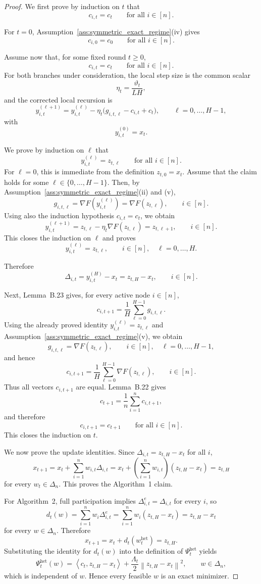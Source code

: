 \documentclass{article}
\theoremstyle{definition}
\newcommand{\norm}[1]{\left\lVert #1\right\rVert}
\newcommand{\ip}[2]{\left\langle #1,#2\right\rangle}
\begin{document}
\begin{proof}
We first prove by induction on $t$ that
\[
c_{i,t} = c_t
\qquad \text{for all } i \in [n].
\]

For $t=0$, Assumption~\ref{ass:symmetric_exact_regime}(iv) gives
\[
c_{i,0} = c_0
\qquad \text{for all } i \in [n].
\]

Assume now that, for some fixed round $t \ge 0$,
\[
c_{i,t} = c_t
\qquad \text{for all } i \in [n].
\]
For both branches under consideration, the local step size is the common scalar
\[
\eta_t = \frac{\vartheta_t}{LH},
\]
and the corrected local recursion is
\[
y_{i,t}^{(\ell+1)}
=
y_{i,t}^{(\ell)} - \eta_t\bigl(g_{i,t,\ell} - c_{i,t} + c_t\bigr),
\qquad
\ell = 0,\dots,H-1,
\]
with
\[
y_{i,t}^{(0)} = x_t.
\]

We prove by induction on $\ell$ that
\[
y_{i,t}^{(\ell)} = z_{t,\ell}
\qquad \text{for all } i \in [n].
\]
For $\ell=0$, this is immediate from the definition $z_{t,0}=x_t$.
Assume that the claim holds for some $\ell \in \{0,\dots,H-1\}$. Then, by Assumption~\ref{ass:symmetric_exact_regime}(ii) and (v),
\[
g_{i,t,\ell}
=
\nabla F\!\left(y_{i,t}^{(\ell)}\right)
=
\nabla F(z_{t,\ell}),
\qquad i \in [n].
\]
Using also the induction hypothesis $c_{i,t}=c_t$, we obtain
\[
y_{i,t}^{(\ell+1)}
=
z_{t,\ell} - \eta_t \nabla F(z_{t,\ell})
=
z_{t,\ell+1},
\qquad i \in [n].
\]
This closes the induction on $\ell$ and proves
\[
y_{i,t}^{(\ell)} = z_{t,\ell},
\qquad i \in [n], \quad \ell=0,\dots,H.
\]

Therefore
\[
\Delta_{i,t}
=
y_{i,t}^{(H)} - x_t
=
z_{t,H} - x_t,
\qquad i \in [n].
\]

Next, Lemma~B.23 gives, for every active node $i \in [n]$,
\[
c_{i,t+1}
=
\frac1H \sum_{\ell=0}^{H-1} g_{i,t,\ell}.
\]
Using the already proved identity $y_{i,t}^{(\ell)} = z_{t,\ell}$ and Assumption~\ref{ass:symmetric_exact_regime}(v), we obtain
\[
g_{i,t,\ell}
=
\nabla F(z_{t,\ell}),
\qquad i \in [n], \quad \ell=0,\dots,H-1,
\]
and hence
\[
c_{i,t+1}
=
\frac1H \sum_{\ell=0}^{H-1} \nabla F(z_{t,\ell}),
\qquad i \in [n].
\]
Thus all vectors $c_{i,t+1}$ are equal. Lemma~B.22 gives
\[
c_{t+1} = \frac1n \sum_{i=1}^n c_{i,t+1},
\]
and therefore
\[
c_{i,t+1} = c_{t+1}
\qquad \text{for all } i \in [n].
\]
This closes the induction on $t$.

We now prove the update identities. Since $\Delta_{i,t}=z_{t,H}-x_t$ for all $i$,
\[
x_{t+1}
=
x_t + \sum_{i=1}^n w_{i,t}\Delta_{i,t}
=
x_t + \left(\sum_{i=1}^n w_{i,t}\right)(z_{t,H}-x_t)
=
z_{t,H}
\]
for every $w_t \in \Delta_n$. This proves the Algorithm~1 claim.

For Algorithm~2, full participation implies $\Delta_{i,t}^e = \Delta_{i,t}$ for every $i$, so
\[
d_t(w)
=
\sum_{i=1}^n w_i \Delta_{i,t}^e
=
\sum_{i=1}^n w_i (z_{t,H}-x_t)
=
z_{t,H}-x_t
\]
for every $w \in \Delta_n$. Therefore
\[
x_{t+1} = x_t + d_t(w_t^{\mathrm{het}}) = z_{t,H}.
\]
Substituting the identity for $d_t(w)$ into the definition of $\Psi_t^{\mathrm{het}}$ yields
\[
\Psi_t^{\mathrm{het}}(w)
=
\ip{c_t}{z_{t,H}-x_t}
+
\frac{\Lambda_t}{2}\norm{z_{t,H}-x_t}^2,
\qquad w \in \Delta_n,
\]
which is independent of $w$. Hence every feasible $w$ is an exact minimizer.
\end{proof}
\end{document}
